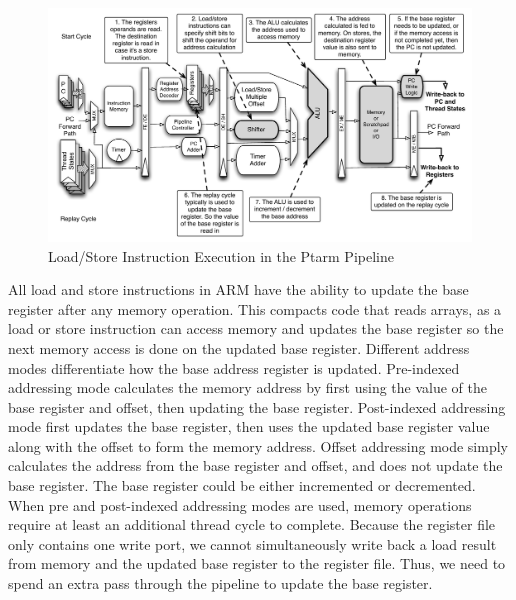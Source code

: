 \begin{figure}[h]
  \vspace{-15pt}
  \begin{center}
    \includegraphics[scale=.54]{figs/ldstr_pipeline_implementation}
  \end{center}
  \vspace{-3mm}
  \caption{Load/Store Instruction Execution in the Ptarm Pipeline}
  \label{fig:ldstr_pipeline_implementation}
\end{figure}

All load and store instructions in ARM have the ability to update the base register after any memory operation. 
This compacts code that reads arrays, as a load or store instruction can access memory and updates the base register so the next memory access is done on the updated base register.
Different address modes differentiate how the base address register is updated. 
Pre-indexed addressing mode calculates the memory address by first using the value of the base register and offset, then updating the base register. 
Post-indexed addressing mode first updates the base register, then uses the updated base register value along with the offset to form the memory address.
Offset addressing mode simply calculates the address from the base register and offset, and does not update the base register. 
The base register could be either incremented or decremented. 
When pre and post-indexed addressing modes are used, memory operations require at least an additional thread cycle to complete.
Because the register file only contains one write port, we cannot simultaneously write back a load result from memory and the updated base register to the register file. 
Thus, we need to spend an extra pass through the pipeline to update the base register.

